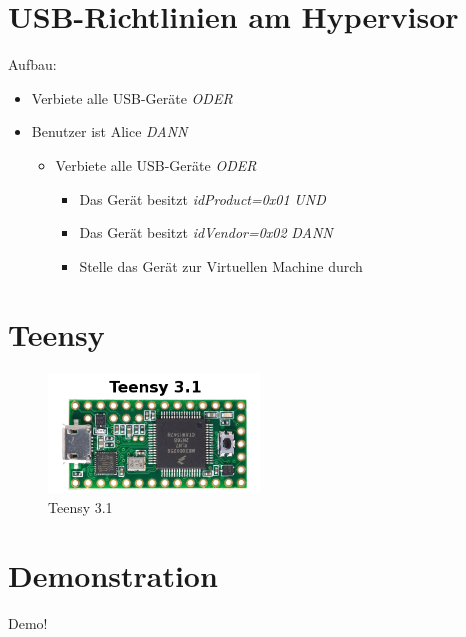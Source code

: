 \documentclass[]{beamer}
\begin{document}
	\section{USB-Richtlinien am Hypervisor}
	\begin{frame}{\secname}
		Aufbau:
		\begin{itemize}
			\item Verbiete alle USB-Geräte \textit{ODER}
			\item Benutzer ist Alice \textit{DANN}
			\begin{itemize}
				\item Verbiete alle USB-Geräte \textit{ODER}
				\begin{itemize}
					\item Das Gerät besitzt \textit{idProduct=0x01} \textit{UND}
					\item Das Gerät besitzt \textit{idVendor=0x02} \textit{DANN}
					\item Stelle das Gerät zur Virtuellen Machine durch		
				\end{itemize}
			\end{itemize}						
			
		\end{itemize}
	\end{frame}

	\section{Teensy}
	\begin{frame}{\secname}
		\begin{figure}[htbp]
			\centering
			\includegraphics[width=0.5\textwidth]{bilder/teensy31.png}
			\caption{Teensy 3.1}
			\label{fig:Teensy}
		\end{figure}
	\end{frame}
	\section{Demonstration}

	\begin{frame}{\secname}
		Demo!
	\end{frame}
	
\end{document}
